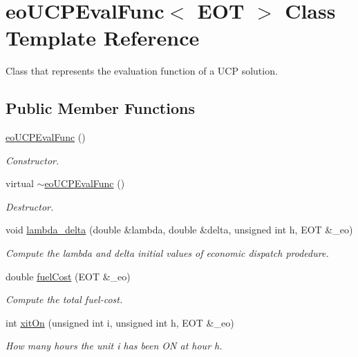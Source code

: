\hypertarget{classeo_u_c_p_eval_func}{\section{eo\-U\-C\-P\-Eval\-Func$<$ \-E\-O\-T $>$ \-Class \-Template \-Reference}
\label{classeo_u_c_p_eval_func}
}


\-Class that represents the evaluation function of a \-U\-C\-P solution.  


\subsection*{\-Public \-Member \-Functions}
\begin{DoxyCompactItemize}
\item 
\hyperlink{classeo_u_c_p_eval_func_ae9d748b804bff90c592a542a9d281ca7}{eo\-U\-C\-P\-Eval\-Func} ()
\begin{DoxyCompactList}\small\item\em \-Constructor. \end{DoxyCompactList}\item 
virtual \hyperlink{classeo_u_c_p_eval_func_adfc449cc6922b629861843a3616edd45}{$\sim$eo\-U\-C\-P\-Eval\-Func} ()
\begin{DoxyCompactList}\small\item\em \-Destructor. \end{DoxyCompactList}\item 
void \hyperlink{classeo_u_c_p_eval_func_ac909e3f32924a1f5f4ca545498497c6f}{lambda\-\_\-delta} (double \&lambda, double \&delta, unsigned int h, \-E\-O\-T \&\-\_\-eo)
\begin{DoxyCompactList}\small\item\em \-Compute the lambda and delta initial values of economic dispatch prodedure. \end{DoxyCompactList}\item 
double \hyperlink{classeo_u_c_p_eval_func_ab0b2c6b8fe656e09b8fee32bfe9f1874}{fuel\-Cost} (\-E\-O\-T \&\-\_\-eo)
\begin{DoxyCompactList}\small\item\em \-Compute the total fuel-\/cost. \end{DoxyCompactList}\item 
int \hyperlink{classeo_u_c_p_eval_func_a611f612aae4e4ab180d5cfa44a3fcc0f}{xit\-On} (unsigned int i, unsigned int h, \-E\-O\-T \&\-\_\-eo)
\begin{DoxyCompactList}\small\item\em \-How many hours the unit i has been \-O\-N at hour h. \end{DoxyCompactList}\item 

\end{DoxyCompactItemize}

